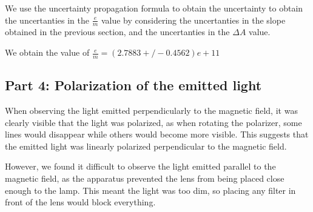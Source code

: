 We use the uncertainty propagation formula to obtain the uncertainty to obtain the uncertanties in the $\frac{e}{m}$ value
by considering the uncertanties in the slope obtained in the previous section, and the uncertanties in the $\Delta A$ value.


We obtain the value of $\frac{e}{m} = (2.7883+/-0.4562)e+11$

\subsection{Part 4: Polarization of the emitted light}
When observing the light emitted perpendicularly to the magnetic field, it was clearly visible that the light was polarized, as when rotating the polarizer, some lines would disappear while others would become more visible. This suggests that the emitted light was linearly polarized perpendicular to the magnetic field.

However, we found it difficult to observe the light emitted parallel to the magnetic field, as the apparatus prevented the lens from being placed close enough to the lamp. This meant the light was too dim, so placing any filter in front of the lens would block everything.